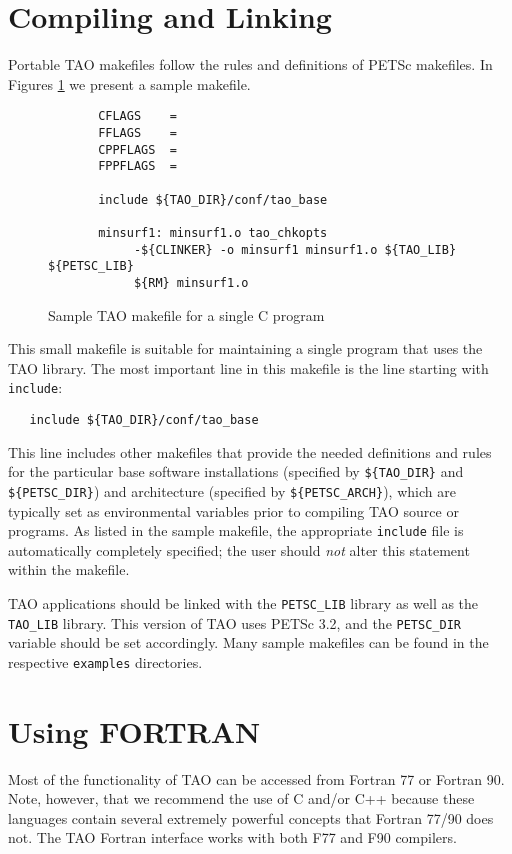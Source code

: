\section{Compiling and Linking}

Portable TAO makefiles follow the rules and definitions
of PETSc makefiles.
In Figures \ref{fig:make3} we present a sample makefile.

\begin{figure}[tbh]
{\footnotesize
\begin{verbatim}   
       CFLAGS    = 
       FFLAGS    = 
       CPPFLAGS  =
       FPPFLAGS  =
       
       include ${TAO_DIR}/conf/tao_base
   
       minsurf1: minsurf1.o tao_chkopts
            -${CLINKER} -o minsurf1 minsurf1.o ${TAO_LIB} ${PETSC_LIB}
            ${RM} minsurf1.o
\end{verbatim} 
\noindent
}
\caption{Sample TAO makefile for a single C program}
\label{fig:make3}
\end{figure}

This small makefile is suitable for maintaining a single program that
uses the TAO library.  The most important line in this makefile is the
line starting with {\tt include}:
\begin{verbatim}
   include ${TAO_DIR}/conf/tao_base
\end{verbatim}
\noindent %
This line includes other makefiles that provide the needed definitions
and rules for the particular base software installations (specified by
{\tt \$\{TAO\_DIR\}} and {\tt \$\{PETSC\_DIR\}}) and architecture
(specified by {\tt \$\{PETSC\_ARCH\}}), which are typically set as
environmental variables prior to compiling TAO source or programs.  As
listed in the sample makefile, the appropriate {\tt include} file is
automatically completely specified; the user should {\em not} alter
this statement within the makefile.
 
TAO applications should be linked with the
{\tt PETSC\_LIB} library
as well as the {\tt TAO\_LIB} library. This version of TAO uses
PETSc 3.2, and the {\tt PETSC\_DIR} variable
should be set accordingly.  Many sample makefiles
can be found in the respective {\tt examples} directories.

\section{Using FORTRAN}
\label{chapter:fortran}
Most of the functionality of TAO can be accessed from Fortran 77 or 
Fortran 90.  Note, however, that we recommend the use of C and/or C++ 
because these languages contain several extremely powerful concepts 
that Fortran 77/90 does not.  The TAO Fortran interface works with 
both F77 and F90 compilers.

